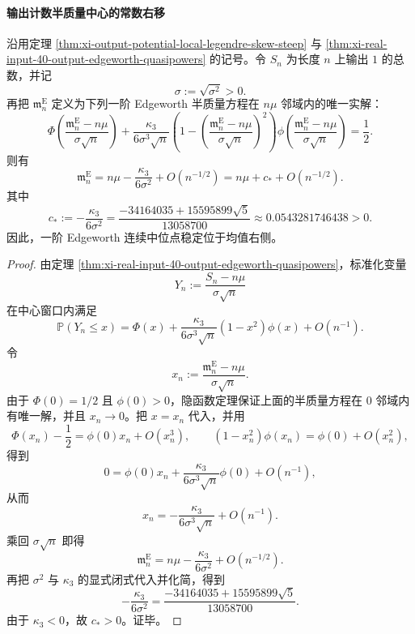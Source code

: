 \paragraph{输出计数半质量中心的常数右移}

\begin{corollary}\label{cor:xi-real-input-40-output-edgeworth-continuous-median-right-shift}
沿用定理 \ref{thm:xi-output-potential-local-legendre-skew-steep} 与
\ref{thm:xi-real-input-40-output-edgeworth-quasipowers} 的记号。令 \(S_n\) 为长度 \(n\) 上输出 \(1\) 的总数，并记
\[
\sigma:=\sqrt{\sigma^2}>0.
\]
再把 \(\mathfrak m_n^{\mathrm E}\) 定义为下列一阶 Edgeworth 半质量方程在 \(n\mu\) 邻域内的唯一实解：
\[
\Phi\!\left(\frac{\mathfrak m_n^{\mathrm E}-n\mu}{\sigma\sqrt n}\right)
+\frac{\kappa_3}{6\sigma^3\sqrt n}
\left(
1-\left(\frac{\mathfrak m_n^{\mathrm E}-n\mu}{\sigma\sqrt n}\right)^2
\right)
\phi\!\left(\frac{\mathfrak m_n^{\mathrm E}-n\mu}{\sigma\sqrt n}\right)
=
\frac12.
\]
则有
\[
\boxed{\;
\mathfrak m_n^{\mathrm E}
=
n\mu-\frac{\kappa_3}{6\sigma^2}+O(n^{-1/2})
=
n\mu+c_*+O(n^{-1/2}).\;}
\]
其中
\[
\boxed{\;
c_*:=-\frac{\kappa_3}{6\sigma^2}
=
\frac{-34164035+15595899\sqrt5}{13058700}
\approx 0.0543281746438>0.\;}
\]
因此，一阶 Edgeworth 连续中位点稳定位于均值右侧。
\end{corollary}
\begin{proof}
由定理 \ref{thm:xi-real-input-40-output-edgeworth-quasipowers}，标准化变量
\[
Y_n:=\frac{S_n-n\mu}{\sigma\sqrt n}
\]
在中心窗口内满足
\[
\mathbb P(Y_n\le x)
=
\Phi(x)+\frac{\kappa_3}{6\sigma^3\sqrt n}(1-x^2)\phi(x)+O(n^{-1}).
\]
令
\[
x_n:=\frac{\mathfrak m_n^{\mathrm E}-n\mu}{\sigma\sqrt n}.
\]
由于 \(\Phi(0)=1/2\) 且 \(\phi(0)>0\)，隐函数定理保证上面的半质量方程在 \(0\) 邻域内有唯一解，并且 \(x_n\to 0\)。把 \(x=x_n\) 代入，并用
\[
\Phi(x_n)-\frac12=\phi(0)x_n+O(x_n^3),
\qquad
(1-x_n^2)\phi(x_n)=\phi(0)+O(x_n^2),
\]
得到
\[
0
=
\phi(0)x_n+\frac{\kappa_3}{6\sigma^3\sqrt n}\phi(0)+O(n^{-1}),
\]
从而
\[
x_n=-\frac{\kappa_3}{6\sigma^3\sqrt n}+O(n^{-1}).
\]
乘回 \(\sigma\sqrt n\) 即得
\[
\mathfrak m_n^{\mathrm E}
=
n\mu-\frac{\kappa_3}{6\sigma^2}+O(n^{-1/2}).
\]
再把 \(\sigma^2\) 与 \(\kappa_3\) 的显式闭式代入并化简，得到
\[
-\frac{\kappa_3}{6\sigma^2}
=
\frac{-34164035+15595899\sqrt5}{13058700}.
\]
由于 \(\kappa_3<0\)，故 \(c_*>0\)。证毕。
\end{proof}



\endinput
